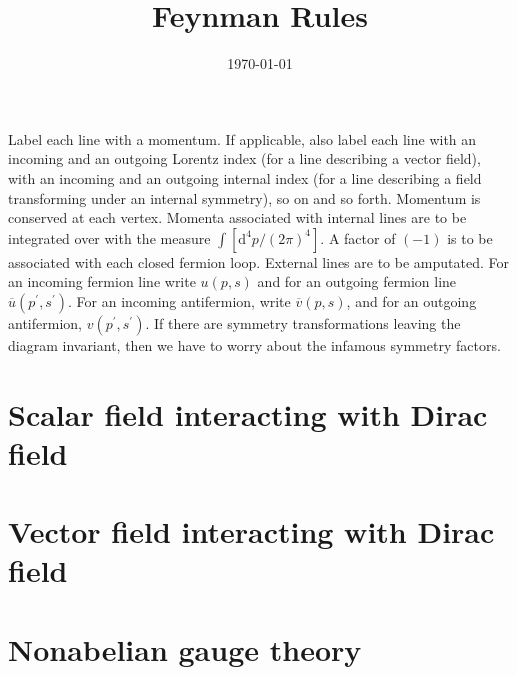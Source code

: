 \documentclass[11pt,a4paper]{article}
\title{Feynman Rules}
\author{}
\date{\today}
\newcommand{\dif}{\mathrm{d}}
\newcounter{theo}[section]\setcounter{theo}{0}
\begin{document}
\maketitle

\cite{2010qftn.book.....Z} Label each line with a momentum. If applicable, also label each line with an incoming and an outgoing Lorentz index (for a line describing a vector field), with an incoming and an outgoing internal index (for a line describing a field transforming under an internal symmetry), so on and so forth. Momentum is conserved at each vertex. Momenta associated with internal lines are to be integrated over with the measure $\int [\dif^4 p/(2\pi)^4]$. A factor of $(-1)$ is to be associated with each closed fermion loop. External lines are to be amputated. For an incoming fermion line write $u(p, s)$ and for an outgoing fermion line $\overline{u}(p^\prime, s^\prime)$. For an incoming antifermion, write $\overline{v}(p, s)$, and for an outgoing antifermion, $v(p^\prime, s^\prime)$. If there are symmetry transformations leaving the diagram invariant, then we have to worry about the infamous symmetry factors.

\section{Scalar field interacting with Dirac field}












\section{Vector field interacting with Dirac field}








\section{Nonabelian gauge theory}
\end{document}
